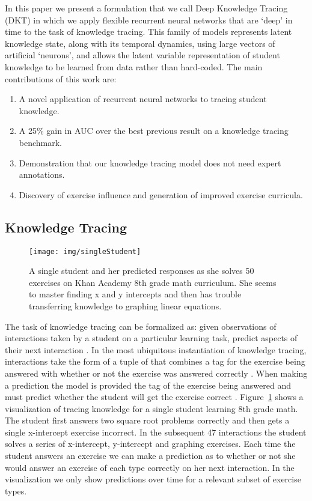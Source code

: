 \documentclass{article} \usepackage{nips,times}
\begin{document}
In this paper we present a formulation that we call Deep Knowledge Tracing (DKT) in which we apply flexible recurrent neural networks that are `deep' in time to the task of knowledge tracing. 
This family of models represents latent knowledge state, along with its temporal dynamics, using large vectors of artificial `neurons', and allows the latent variable representation of student knowledge to be learned from data rather than hard-coded.
The main contributions of this work are:
\begin{enumerate}
\item A novel application of recurrent neural networks to tracing student knowledge.
\item A 25\% gain in AUC over the best previous result on a knowledge tracing benchmark. 
\item Demonstration that our knowledge tracing model does not need expert annotations.
\item Discovery of exercise influence and generation of improved exercise curricula.
\end{enumerate}

\subsection{Knowledge Tracing}
\begin{figure}[t]
\centering
\texttt{[image: img/singleStudent]}
\vspace{-3mm}
\caption{A single student and her predicted responses as she solves 50 exercises on Khan Academy 8th grade math curriculum. She seems to master finding x and y intercepts and then has trouble transferring knowledge to graphing linear equations.
\label{fig:singleStudent}
}
\vspace{-3mm}
\end{figure}



The task of knowledge tracing can be formalized as: given observations of interactions  taken by a student on a particular learning task, predict aspects of their next interaction  \cite{corbett1994knowledge}. In the most ubiquitous instantiation of knowledge tracing, interactions take the form of a tuple of  that combines a tag for the exercise being answered  with whether or not the exercise was answered correctly .  When making a prediction the model is provided the tag of the exercise being answered  and must predict whether the student will get the exercise correct . Figure~\ref{fig:singleStudent} shows a visualization of tracing knowledge for a single student learning 8th grade math. The student first answers two square root problems correctly and then gets a single x-intercept exercise incorrect. In the subsequent 47 interactions the student solves a series of x-intercept, y-intercept and graphing exercises. Each time the student answers an exercise we can make a prediction as to whether or not she would answer an exercise of each type correctly on her next interaction. In the visualization we only show predictions over time for a relevant subset of exercise types.
\end{document}
